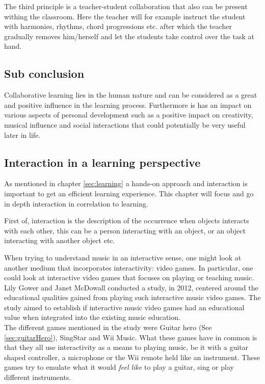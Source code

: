 The third principle is a teacher-student collaboration that also can be present withing the classroom. Here the teacher will for example instruct the student with harmonies, rhythms, chord progressions etc. after which the teacher gradually removes him/herself and let the students take control over the task at hand.\\


\subsection*{Sub conclusion}
Collaborative learning lies in the human nature and can be considered as a great and positive influence in the learning process. Furthermore is has an impact on various aspects of personal development such as a positive impact on creativity, musical influence and social interactions that could potentially be very useful later in life.


\subsection{Interaction in a learning perspective}
As mentioned in chapter \ref{sec:learning} a hands-on approach and interaction is important to get an efficient learning experience. This chapter will focus and go in depth interaction in correlation to learning.

First of, interaction is the description of the occurrence when objects interacts with each other, this can be a person interacting with an object, or an object interacting with another object etc.


When trying to understand music in an interactive sense, one might look at another medium that incorporates interactivity: video games. In particular, one could look at interactive video games that focuses on playing or teaching music. Lily Gower and Janet McDowall conducted a study, in 2012, centered around the educational qualities gained from playing such interactive music video games\cite{interactiveMusicVideoGames}. The study aimed to establish if interactive music video games had an educational value when integrated into the existing music education.\\

The different games mentioned in the study were Guitar hero (See \autoref{sec:guitarHero}), SingStar and Wii Music. What these games have in common is that they all use interactivity as a means to playing music, be it with a guitar shaped controller, a microphone or the Wii remote held like an instrument. These games try to emulate what it would \textit{feel like} to play a guitar, sing or play different instruments.\\


